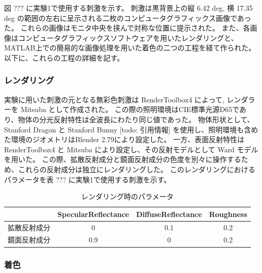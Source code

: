         図 ??? に実験1で使用する刺激を示す。
        刺激は黒背景上の縦 6.42 deg, 横 17.35 deg の範囲の左右に呈示される二枚のコンピュータグラフィックス画像であった。
        これらの画像はモニタ中央を挟んで対称な位置に提示された。
        また、各画像はコンピュータグラフィックスソフトウェアを用いたレンダリングと、MATLAB上での簡易的な画像処理を用いた着色の二つの工程を経て作られた。
        以下に、これらの工程の詳細を記す。

        \subsubsection{レンダリング}

            実験に用いた刺激の元となる無彩色刺激は RenderToolbox4 によって, レンダラーを Mitsuba として作成された。
            この際の照明環境はCIE標準光源D65であり、物体の分光反射特性は全波長にわたり同じ値であった。
            物体形状として、Stanford Dragon と Stanford Bunny [todo: 引用情報] を使用し、照明環境も含めた環境のジオメトリはBlender 2.79により設定した。
            一方、表面反射特性は RenderToolbox4 と Mitsuba により設定し、その反射モデルとして Ward モデルを用いた。
            この際、拡散反射成分と鏡面反射成分の色度を別々に操作するため、これらの反射成分は独立にレンダリングした。
            このレンダリングにおけるパラメータを表 ??? に実験1で使用する刺激を示す。

            \begin{table}
                \centering
                \caption{レンダリング時のパラメータ}
                \begin{tabular}{|l||c|c|c|} \hline
                                           & SpecularReflectance & DiffuseReflectance & Roughness \\ \hline \hline
                    拡散反射成分           & 0                   & 0.1                & 0.2 \\ \hline
                    鏡面反射成分           & 0.9                 & 0                  & 0.2 \\ \hline
                \end{tabular}
            \end{table}
        
        \subsubsection{着色}

